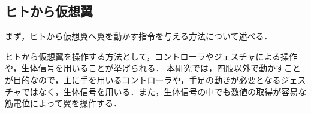    \subsection{ヒトから仮想翼}
    まず，ヒトから仮想翼へ翼を動かす指令を与える方法について述べる．

    ヒトから仮想翼を操作する方法として，コントローラやジェスチャによる操作や，生体信号を用いることが挙げられる．
    本研究では，四肢以外で動かすことが目的なので，主に手を用いるコントローラや，手足の動きが必要となるジェスチャではなく，生体信号を用いる．また，生体信号の中でも数値の取得が容易な筋電位によって翼を操作する．





   
        

